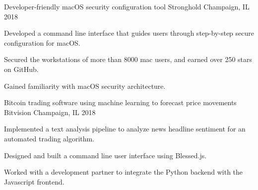 

\begin{cventries}
\cventry
{Developer-friendly macOS security configuration tool} %
{Stronghold} %
{Champaign, IL} %
{2018} %
{
	\begin{cvitems} %
		\item {Developed a command line interface that guides users through step-by-step secure configuration for macOS.}
		\item {Secured the workstations of more than 8000 mac users, and earned over 250 stars on GitHub.}
		\item{Gained familiarity with macOS security architecture.} 
	\end{cvitems}
}
\cventry
{Bitcoin trading software using machine learning to forecast price movements} %
{Bitvision} %
{Champaign, IL} %
{2018} %
{
	\begin{cvitems} %
		\item {Implemented a text analysis pipeline to analyze news headline sentiment for an automated trading algorithm.}
		\item {Designed and built a command line user interface using Blessed.js.}
		\item {Worked with a development partner to integrate the Python backend with the Javascript frontend.}
	\end{cvitems}
}


\end{cventries}
